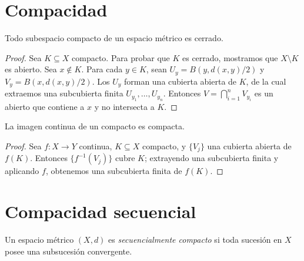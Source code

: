 \section{Compacidad}

\begin{proposition}
\label{prop:compacto-cerrado}
Todo subespacio compacto de un espacio métrico es cerrado.
\end{proposition}
\begin{proof}
Sea $K\subseteq X$ compacto. Para probar que $K$ es cerrado, mostramos que $X\setminus K$ es abierto. Sea $x\notin K$. Para cada $y\in K$, sean $U_y=B(y,d(x,y)/2)$ y $V_y=B(x,d(x,y)/2)$. Los $U_y$ forman una cubierta abierta de $K$, de la cual extraemos una subcubierta finita $U_{y_1},\dots,U_{y_n}$. Entonces $V=\bigcap_{i=1}^n V_{y_i}$ es un abierto que contiene a $x$ y no intersecta a $K$.
\end{proof}

\begin{proposition}
\label{prop:imagen-compacta}
La imagen continua de un compacto es compacta.
\end{proposition}
\begin{proof}
Sea $f\colon X\to Y$ continua, $K\subseteq X$ compacto, y $\{V_j\}$ una cubierta abierta de $f(K)$. Entonces $\{f^{-1}(V_j)\}$ cubre $K$; extrayendo una subcubierta finita y aplicando $f$, obtenemos una subcubierta finita de $f(K)$.
\end{proof}

\section{Compacidad secuencial}

\begin{definition}
\label{def:compacto-sucesiones}
Un espacio métrico $(X,d)$ es \emph{secuencialmente compacto} si toda sucesión en $X$ posee una subsucesión convergente.
\end{definition}


